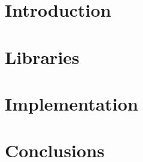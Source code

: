 \section[Intro]{Introduction}


\section[Libs]{Libraries}


\section[Impl]{Implementation}





\section[Con]{Conclusions}
